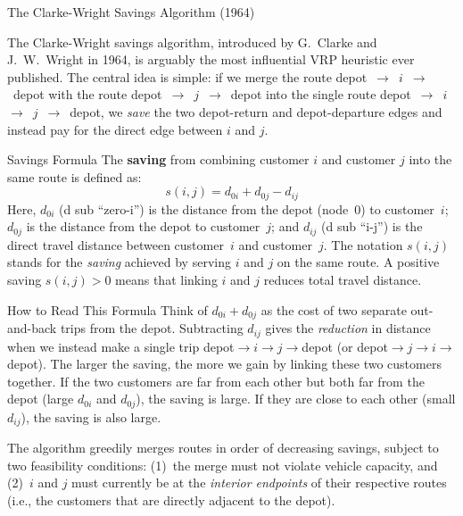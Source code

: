 \documentclass[aspectratio=169,10pt]{beamer}
\begin{document}
\begin{frame}[allowframebreaks]{The Clarke-Wright Savings Algorithm (1964)}

  The Clarke-Wright savings algorithm, introduced by G.\ Clarke and
  J.\ W.\ Wright in 1964, is arguably the most influential VRP heuristic
  ever published.  The central idea is simple: if we merge the route
  \mbox{depot $\to$ $i$ $\to$ depot} with the route
  \mbox{depot $\to$ $j$ $\to$ depot} into the single route
  \mbox{depot $\to$ $i$ $\to$ $j$ $\to$ depot}, we \emph{save}
  the two depot-return and depot-departure edges and instead pay for the
  direct edge between $i$ and $j$.

  \begin{block}{Savings Formula}
    The \textbf{saving} from combining customer $i$ and customer $j$ into
    the same route is defined as:
    \[
      s(i,j) = d_{0i} + d_{0j} - d_{ij}
    \]
    Here, $d_{0i}$ (d sub ``zero-i'') is the distance from the depot
    (node~0) to customer~$i$; $d_{0j}$ is the distance from the depot to
    customer~$j$; and $d_{ij}$ (d sub ``i-j'') is the direct travel
    distance between customer~$i$ and customer~$j$.  The notation $s(i,j)$
    stands for the \emph{saving} achieved by serving $i$ and $j$ on the
    same route.  A positive saving $s(i,j) > 0$ means that linking $i$
    and $j$ reduces total travel distance.
  \end{block}

  \begin{alertblock}{How to Read This Formula}
    Think of $d_{0i} + d_{0j}$ as the cost of two separate out-and-back
    trips from the depot.  Subtracting $d_{ij}$ gives the \emph{reduction}
    in distance when we instead make a single trip depot$\to i\to j\to$depot
    (or depot$\to j\to i\to$depot).  The larger the saving, the more we
    gain by linking these two customers together.  If the two customers
    are far from each other but both far from the depot (large $d_{0i}$
    and $d_{0j}$), the saving is large.  If they are close to each other
    (small $d_{ij}$), the saving is also large.
  \end{alertblock}

  The algorithm greedily merges routes in order of decreasing savings,
  subject to two feasibility conditions: (1)~the merge must not violate
  vehicle capacity, and (2)~$i$ and $j$ must currently be at the
  \emph{interior endpoints} of their respective routes (i.e., the
  customers that are directly adjacent to the depot).


\end{frame}
\end{document}
